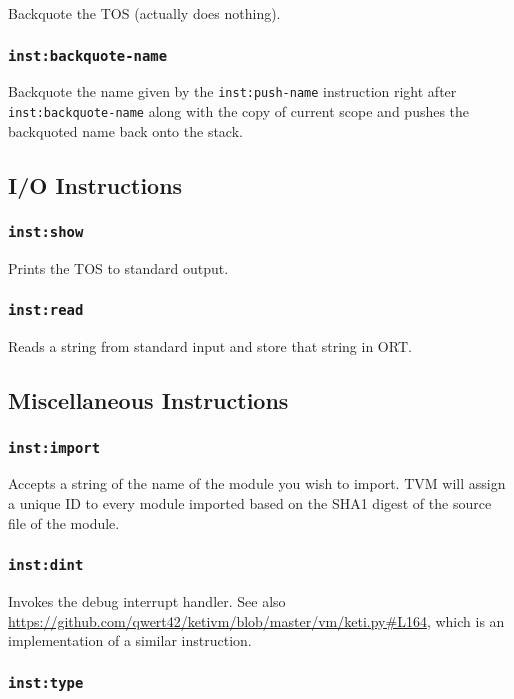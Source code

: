 \documentclass{article}
\newcommand{\inst}[1] {\texttt{inst:#1}}
\begin{document}
Backquote the TOS (actually does nothing).

\subsubsection{\inst{backquote-name}}

Backquote the name given by the \inst{push-name} instruction right after \inst{backquote-name} along with the copy of current scope and pushes the backquoted name back onto the stack.

\subsection{I/O Instructions}

\subsubsection{\inst{show}}

Prints the TOS to standard output.

\subsubsection{\inst{read}}

Reads a string from standard input and store that string in ORT.

\subsection{Miscellaneous Instructions}

\subsubsection{\inst{import}}

Accepts a string of the name of the module you wish to import. TVM will assign a unique ID to every module imported based on the SHA1 digest of the source file of the module.

\subsubsection{\inst{dint}}

Invokes the debug interrupt handler. See also \url{https://github.com/qwert42/ketivm/blob/master/vm/keti.py#L164}, which is an implementation of a similar instruction.

\subsubsection{\inst{type}}
\end{document}
